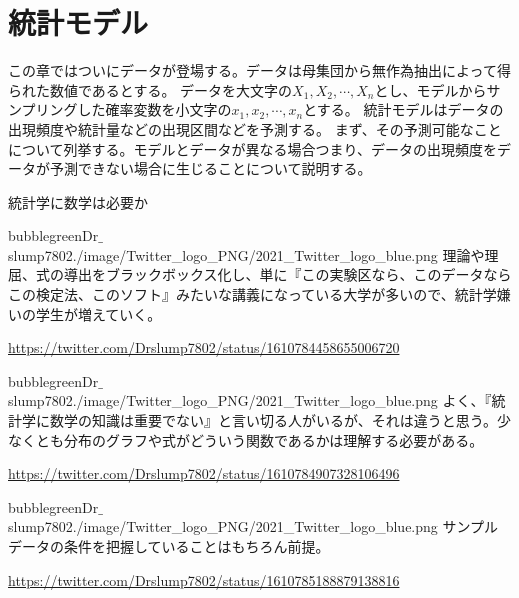 \chapter{統計モデル}
この章ではついにデータが登場する。データは母集団から無作為抽出によって得られた数値であるとする。
データを大文字の$X_1,X_2,\cdots,X_n$とし、モデルからサンプリングした確率変数を小文字の$x_1,x_2,\cdots,x_n$とする。
統計モデルはデータの出現頻度や統計量などの出現区間などを予測する。
まず、その予測可能なことについて列挙する。モデルとデータが異なる場合つまり、データの出現頻度をデータが予測できない場合に生じることについて説明する。
\begin{SMbox}{統計学に数学は必要か}

    \begin{rightbubbles}{bubblegreen}{Dr$\_$slump7802}{./image/Twitter_logo_PNG/2021_Twitter_logo_blue.png}
        理論や理屈、式の導出をブラックボックス化し、単に『この実験区なら、このデータならこの検定法、このソフト』みたいな講義になっている大学が多いので、統計学嫌いの学生が増えていく。

            \begin{flushright} 
                \small	\url{https://twitter.com/Drslump7802/status/1610784458655006720}
            \end{flushright}    
    \end{rightbubbles}

    \begin{rightbubbles}{bubblegreen}{Dr$\_$slump7802}{./image/Twitter_logo_PNG/2021_Twitter_logo_blue.png}
        よく、『統計学に数学の知識は重要でない』と言い切る人がいるが、それは違うと思う。少なくとも分布のグラフや式がどういう関数であるかは理解する必要がある。

            \begin{flushright} 
                \small	\url{https://twitter.com/Drslump7802/status/1610784907328106496}
            \end{flushright}    
        \end{rightbubbles}

    \begin{rightbubbles}{bubblegreen}{Dr$\_$slump7802}{./image/Twitter_logo_PNG/2021_Twitter_logo_blue.png}
        サンプルデータの条件を把握していることはもちろん前提。
            \begin{flushright} 
                \small	\url{https://twitter.com/Drslump7802/status/1610785188879138816}
            \end{flushright}    
        \end{rightbubbles}


\end{SMbox}
